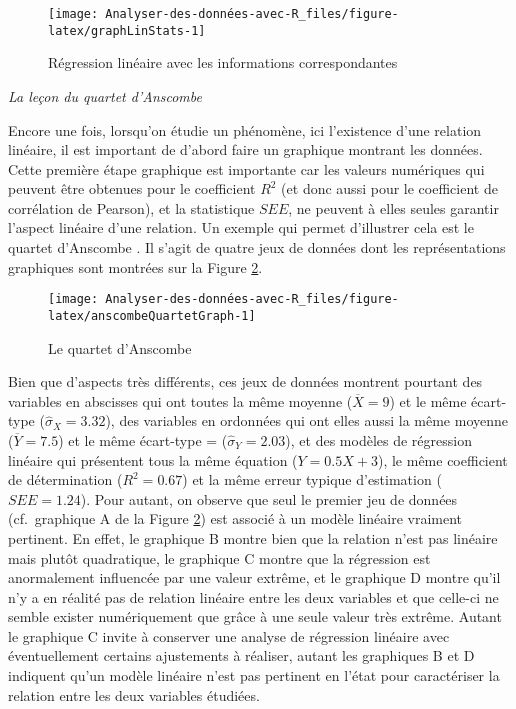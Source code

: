 \documentclass[
]{book}
\begin{document}
\begin{figure}

{\centering \texttt{[image: Analyser-des-données-avec-R\_files/figure-latex/graphLinStats-1]} 

}

\caption{Régression linéaire avec les informations correspondantes}\label{fig:graphLinStats}
\end{figure}

\emph{La leçon du quartet d'Anscombe}

Encore une fois, lorsqu'on étudie un phénomène, ici l'existence d'une relation linéaire, il est important de d'abord faire un graphique montrant les données. Cette première étape graphique est importante car les valeurs numériques qui peuvent être obtenues pour le coefficient \(R^2\) (et donc aussi pour le coefficient de corrélation de Pearson), et la statistique \(SEE\), ne peuvent à elles seules garantir l'aspect linéaire d'une relation. Un exemple qui permet d'illustrer cela est le quartet d'Anscombe \autocite*{anscombeGraphsStatisticalAnalysis1973}. Il s'agit de quatre jeux de données dont les représentations graphiques sont montrées sur la Figure \ref{fig:anscombeQuartetGraph}.

\begin{figure}

{\centering \texttt{[image: Analyser-des-données-avec-R\_files/figure-latex/anscombeQuartetGraph-1]} 

}

\caption{Le quartet d'Anscombe}\label{fig:anscombeQuartetGraph}
\end{figure}

Bien que d'aspects très différents, ces jeux de données montrent pourtant des variables en abscisses qui ont toutes la même moyenne (\(\overline{X} = 9\)) et le même écart-type (\(\hat{\sigma}_{X} = 3.32\)), des variables en ordonnées qui ont elles aussi la même moyenne (\(\overline{Y} = 7.5\)) et le même écart-type = (\(\hat{\sigma}_{Y} = 2.03\)), et des modèles de régression linéaire qui présentent tous la même équation (\(Y = 0.5X + 3\)), le même coefficient de détermination (\(R^2 = 0.67\)) et la même erreur typique d'estimation (\(SEE = 1.24\)). Pour autant, on observe que seul le premier jeu de données (cf.~graphique A de la Figure \ref{fig:anscombeQuartetGraph}) est associé à un modèle linéaire vraiment pertinent. En effet, le graphique B montre bien que la relation n'est pas linéaire mais plutôt quadratique, le graphique C montre que la régression est anormalement influencée par une valeur extrême, et le graphique D montre qu'il n'y a en réalité pas de relation linéaire entre les deux variables et que celle-ci ne semble exister numériquement que grâce à une seule valeur très extrême. Autant le graphique C invite à conserver une analyse de régression linéaire avec éventuellement certains ajustements à réaliser, autant les graphiques B et D indiquent qu'un modèle linéaire n'est pas pertinent en l'état pour caractériser la relation entre les deux variables étudiées.
\end{document}
